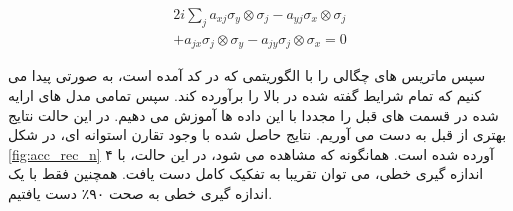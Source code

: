 \begin{equation}
\begin{split}
    2i \sum_j a_{xj}\sigma_y\otimes\sigma_j - a_{yj}\sigma_x\otimes\sigma_j \\
    + a_{jx}\sigma_j\otimes\sigma_y - a_{jy} \sigma_j\otimes\sigma_x = 0
\end{split}
\end{equation}

سپس ماتریس های چگالی را با الگوریتمی که در کد آمده است،‌ به صورتی پیدا می کنیم که تمام شرایط گفته شده در بالا را برآورده کند. سپس تمامی مدل های ارایه شده در قسمت های قبل را مجددا با این داده ها آموزش می دهیم. در این حالت نتایج بهتری از قبل به دست می آوریم. نتایج حاصل شده با وجود تقارن استوانه ای، در شکل
\ref{fig:acc_rec_n}
آورده شده است. همانگونه که مشاهده می شود، در این حالت، با ۴
اندازه گیری خطی، می توان تقریبا به تفکیک کامل دست یافت. همچنین فقط با یک اندازه گیری خطی به صحت
۹۰٪
دست یافتیم.
